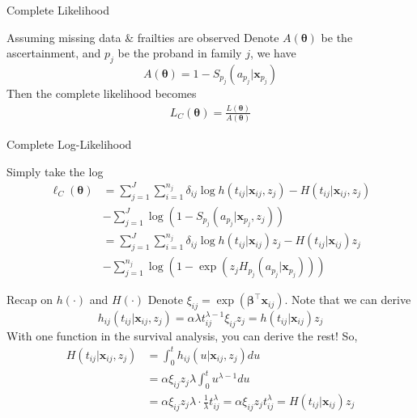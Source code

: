 \documentclass [aspectratio=169]{beamer}
\begin{document}
\begin{frame}{Complete Likelihood}
    \begin{block}{Assuming missing data \& frailties are observed}
        Denote $A(\boldsymbol{\theta})$ be the ascertainment, and $p_j$ be the proband in family $j$, we have 
        \begin{equation} 
            A(\boldsymbol{\theta})=1-S_{p_j}(a_{p_j}|\mathbf{x}_{p_j})
        \end{equation} 
        Then the complete likelihood becomes
        \begin{align} 
            L_C(\boldsymbol{\theta})=\frac{L(\boldsymbol{\theta})}{A(\boldsymbol{\theta})}
        \end{align}
    \end{block}
\end{frame}

\begin{frame}{Complete Log-Likelihood} 
    \begin{block}{Simply take the log} 
        \begin{align} 
            \ell_C(\boldsymbol{\theta})&=\sum_{j=1}^J\sum_{i=1}^{n_j}\delta_{ij}\log h(t_{ij}|\mathbf{x}_{ij}, z_j) - H(t_{ij}|\mathbf{x}_{ij}, z_j)\\
            &-\sum_{j=1}^J \log (1-S_{p_j}(a_{p_j}|\mathbf{x}_{p_j}, z_j)) \\
            &= \sum_{j=1}^J\sum_{i=1}^{n_j}\delta_{ij}\log h(t_{ij}|\mathbf{x}_{ij})z_j - H(t_{ij}|\mathbf{x}_{ij})z_j \\
            &- \sum_{j=1}^{n_j} \log(1- \exp(z_j H_{p_j}(a_{p_j}|\mathbf{x}_{p_j})))
        \end{align}
    \end{block}
\end{frame}

\begin{frame} 
    \begin{block}{Recap on $h(\cdot)$ and $H(\cdot)$} 
        Denote $\xi_{ij}=\exp(\boldsymbol{\beta}^{\top}\mathbf{x}_{ij})$. Note that we can derive 
        \begin{equation} 
            h_{ij}(t_{ij}|\mathbf{x}_{ij}, z_j)=\alpha\lambda t_{ij}^{\lambda-1}\xi_{ij}z_j=h(t_{ij}|\mathbf{x}_{ij})z_j
        \end{equation}
        With one function in the survival analysis, you can derive the rest! So, 
        \begin{align} 
            H(t_{ij}|\mathbf{x}_{ij}, z_j)&=\int_0^{t}h_{ij}(u|\mathbf{x}_{ij}, z_j)du\\
            &=\alpha\xi_{ij}z_j\lambda\int_0^t u^{\lambda-1}du\\
            &=\alpha\xi_{ij}z_j\lambda\cdot \frac{1}{\lambda} t_{ij}^{\lambda}=\alpha\xi_{ij}z_j t_{ij}^{\lambda}=H(t_{ij}|\mathbf{x}_{ij})z_j
        \end{align}
    \end{block}
\end{frame}
\end{document}
